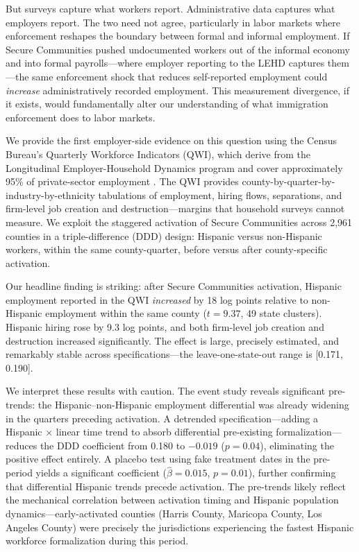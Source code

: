 \documentclass[12pt]{article}
\begin{document}
But surveys capture what workers report. Administrative data captures what employers report. The two need not agree, particularly in labor markets where enforcement reshapes the boundary between formal and informal employment. If Secure Communities pushed undocumented workers out of the informal economy and into formal payrolls---where employer reporting to the LEHD captures them---the same enforcement shock that reduces self-reported employment could \textit{increase} administratively recorded employment. This measurement divergence, if it exists, would fundamentally alter our understanding of what immigration enforcement does to labor markets.

We provide the first employer-side evidence on this question using the Census Bureau's Quarterly Workforce Indicators (QWI), which derive from the Longitudinal Employer-Household Dynamics program and cover approximately 95\% of private-sector employment \citep{abowd2009lehd}. The QWI provides county-by-quarter-by-industry-by-ethnicity tabulations of employment, hiring flows, separations, and firm-level job creation and destruction---margins that household surveys cannot measure. We exploit the staggered activation of Secure Communities across 2,961 counties in a triple-difference (DDD) design: Hispanic versus non-Hispanic workers, within the same county-quarter, before versus after county-specific activation.

Our headline finding is striking: after Secure Communities activation, Hispanic employment reported in the QWI \textit{increased} by 18 log points relative to non-Hispanic employment within the same county ($t = 9.37$, 49 state clusters). Hispanic hiring rose by 9.3 log points, and both firm-level job creation and destruction increased significantly. The effect is large, precisely estimated, and remarkably stable across specifications---the leave-one-state-out range is [0.171, 0.190].

We interpret these results with caution. The event study reveals significant pre-trends: the Hispanic--non-Hispanic employment differential was already widening in the quarters preceding activation. A detrended specification---adding a Hispanic $\times$ linear time trend to absorb differential pre-existing formalization---reduces the DDD coefficient from 0.180 to $-0.019$ ($p = 0.04$), eliminating the positive effect entirely. A placebo test using fake treatment dates in the pre-period yields a significant coefficient ($\hat{\beta} = 0.015$, $p = 0.01$), further confirming that differential Hispanic trends precede activation. The pre-trends likely reflect the mechanical correlation between activation timing and Hispanic population dynamics---early-activated counties (Harris County, Maricopa County, Los Angeles County) were precisely the jurisdictions experiencing the fastest Hispanic workforce formalization during this period.
\end{document}
